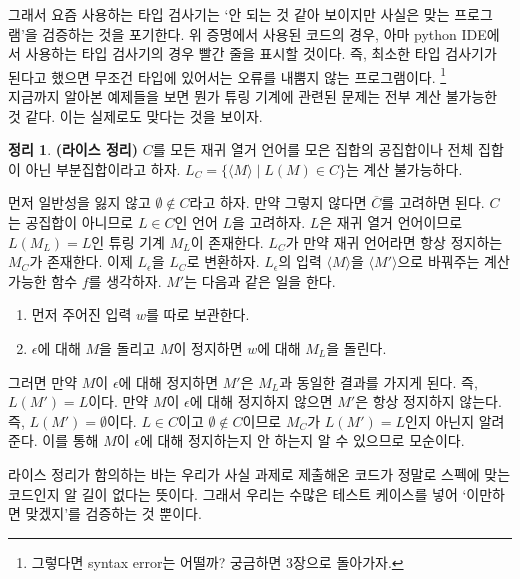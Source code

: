 \documentclass[b5paper, 11pt]{book}
\theoremstyle{definition}
\newtheorem{thm}[defn]{정리}
\newenvironment{pf*}{\pushQED{\qed}\pf}
{\popQED\endpf}
\begin{document}
그래서 요즘 사용하는 타입 검사기는 `안 되는 것 같아 보이지만 사실은 맞는 프로그램'을 검증하는 것을 포기한다. 위 증명에서 사용된 코드의 경우, 아마 python IDE에서 사용하는 타입 검사기의 경우 빨간 줄을 표시할 것이다. 즉, 최소한 타입 검사기가 된다고 했으면 무조건 타입에 있어서는 오류를 내뿜지 않는 프로그램이다. \footnote{그렇다면 syntax error는 어떨까? 궁금하면 3장으로 돌아가자.} \\
지금까지 알아본 예제들을 보면 뭔가 튜링 기계에 관련된 문제는 전부 계산 불가능한 것 같다. 이는 실제로도 맞다는 것을 보이자.
\begin{thm}
    \textbf{(라이스 정리)} $C$를 모든 재귀 열거 언어를 모은 집합의 공집합이나 
    전체 집합이 아닌 부분집합이라고 하자. $L_C = \{ \langle M \rangle \; \vert 
    \; L(M) \in C\}$는 계산 불가능하다. 
\end{thm}
\begin{pf*}
    먼저 일반성을 잃지 않고 $\emptyset \notin C$라고 하자. 만약 그렇지 않다면 $\overline{C}$를 고려하면 된다. $C$는 공집합이 아니므로 $L\in C$인 언어 $L$을 고려하자. $L$은 재귀 열거 언어이므로 $L(M_L) = L$인 튜링 기계 $M_L$이 존재한다. $L_C$가 만약 재귀 언어라면 항상 정지하는 $M_C$가 존재한다. 이제 $L_\epsilon$을 $L_C$로 변환하자. $L_\epsilon$의 입력  $\langle M \rangle$을 $\langle M' \rangle$으로 바꿔주는 계산 가능한 함수 $f$를 생각하자. $M'$는 다음과 같은 일을 한다.
    \begin{enumerate}
        \item 먼저 주어진 입력 $w$를 따로 보관한다.
        \item $\epsilon$에 대해 $M$을 돌리고 $M$이 정지하면 $w$에 대해 $M_L$을 돌린다.
    \end{enumerate}
    그러면 만약 $M$이 $\epsilon$에 대해 정지하면 $M'$은 $M_L$과 동일한 결과를 가지게 된다. 즉, $L(M') = L$이다. 만약 $M$이 $\epsilon$에 대해 정지하지 않으면 $M'$은 항상 정지하지 않는다. 즉, $L(M') = \emptyset$이다. $L \in C$이고 $\emptyset \notin C$이므로 $M_C$가 $L(M') = L$인지 아닌지 알려준다. 이를 통해 $M$이 $\epsilon$에 대해 정지하는지 안 하는지 알 수 있으므로 모순이다.
\end{pf*}
라이스 정리가 함의하는 바는 우리가 사실 과제로 제출해온 코드가 정말로 스펙에 맞는 코드인지 알 길이 없다는 뜻이다. 그래서 우리는 수많은 테스트 케이스를 넣어 `이만하면 맞겠지'를 검증하는 것 뿐이다.
\end{document}
